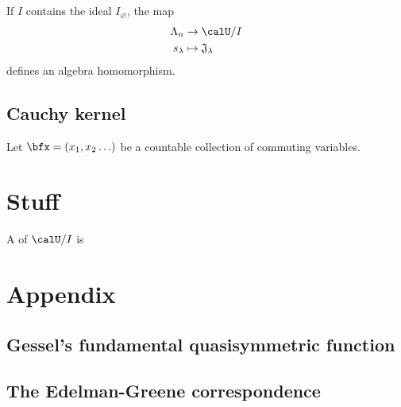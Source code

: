 \documentclass{article}
\newcommand*\frkJ{\mathfrak{J}}
\begin{document}
\begin{corollary}
    [\cite{FG98}]
    If $I$ contains the ideal $I_\varnothing$, the map 
    \begin{align*}
        \Lambda_n
        &\to
        \calU/I
        \\
        s_\lambda
        &\mapsto
        \frkJ_\lambda
    \end{align*}
    defines an algebra homomorphism.
\end{corollary}

\subsection{Cauchy kernel}

\begin{definition}
    Let $\bfx = (x_1,x_2\ldots)$ be a countable collection of commuting variables.
\end{definition}

\section{Stuff}

\begin{definition}
    A  of $\calU/I$ is
\end{definition}

\begin{definition}
\end{definition}


\section{Appendix}

\subsection{Gessel's fundamental quasisymmetric function}

\subsection{The Edelman-Greene correspondence}
\end{document}
